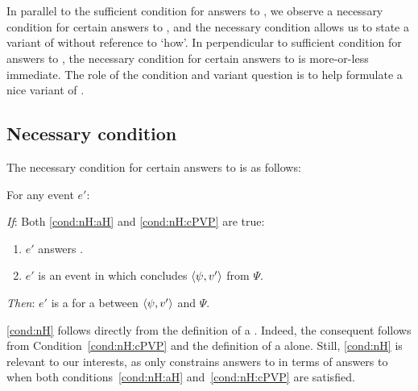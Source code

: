 \section{\qHowV{}}
\label{cha:var:qhowv}


\begin{note}
  In parallel to the sufficient condition for answers to \qWhy{}, we observe a necessary condition for certain answers to \qHow{}, and the necessary condition allows us to state a variant of \qHow{} without reference to `how'.
  In perpendicular to sufficient condition for answers to \qWhy{}, the necessary condition for certain answers to \qHow{} is more-or-less immediate.
  The role of the condition and variant question is to help formulate a nice variant of \issueInclusion{}.
\end{note}


\subsection{Necessary condition}
\label{sec:necessary-condition}

\begin{note}
  The necessary condition for certain answers to \qHow{} is as follows:

  \begin{condition}[\wit{3}]%
    \label{cond:nH}%
    For any event \(e'\):
    \begin{itenum}
    \item[\emph{If}:]
      Both \ref{cond:nH:aH} and \ref{cond:nH:cPVP} are true:
      \begin{enumerate}[label=\arabic*., ref=\arabic*]
      \item
        \label{cond:nH:aH}
        \(e'\) answers \qHow{}.
      \item
        \label{cond:nH:cPVP}
        \(e'\) is an event in which \vAgent{} concludes \(\langle \psi, v' \rangle\) from \(\Psi\).
      \end{enumerate}
    \item[\emph{Then}:]
      \(e'\) is a \wit{} for a \ros{} between \(\langle \psi, v' \rangle\) and \(\Psi\).
    \end{itenum}
    \vspace{-\baselineskip}
  \end{condition}

  \noindent%
  \autoref{cond:nH} follows directly from the definition of a \wit{}.
  Indeed, the consequent follows from Condition~\ref{cond:nH:cPVP} and the definition of a \wit{} alone.
  Still, \autoref{cond:nH} is relevant to our interests, as \issueInclusion{} only constrains answers to \qWhy{} in terms of answers to \qHow{} when both conditions~\ref{cond:nH:aH} and~\ref{cond:nH:cPVP} are satisfied.
\end{note}

